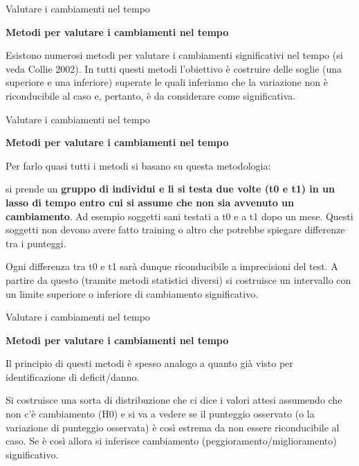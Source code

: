 \documentclass[
  ignorenonframetext,
  aspectratio=169,
]{beamer}
\begin{document}
\begin{frame}{Valutare i cambiamenti nel tempo}
\label{valutare-i-cambiamenti-nel-tempo-6}
\begin{center}
  \textbf{Metodi per valutare i cambiamenti nel tempo}
\end{center}
\vspace{2em}

Esistono numerosi metodi per valutare i cambiamenti significativi nel
tempo (si veda Collie 2002). In tutti questi metodi l'obiettivo è
costruire delle soglie (una superiore e una inferiore) superate le quali
inferiamo che la variazione non è riconducibile al caso e, pertanto, è
da considerare come significativa.
\end{frame}

\begin{frame}{Valutare i cambiamenti nel tempo}
\label{valutare-i-cambiamenti-nel-tempo-7}
\begin{center}
  \textbf{Metodi per valutare i cambiamenti nel tempo}
\end{center}
\vspace{2em}

Per farlo quasi tutti i metodi si basano su questa metodologia:

si prende un \textbf{gruppo di individui e li si testa due volte (t0 e
t1) in un lasso di tempo entro cui si assume che non sia avvenuto un
cambiamento}. Ad esempio soggetti sani testati a t0 e a t1 dopo un mese.
Questi soggetti non devono avere fatto training o altro che potrebbe
spiegare differenze tra i punteggi.

Ogni differenza tra t0 e t1 sarà dunque riconducibile a imprecisioni del
test. A partire da questo (tramite metodi statistici diversi) si
costruisce un intervallo con un limite superiore o inferiore di
cambiamento significativo.
\end{frame}

\begin{frame}{Valutare i cambiamenti nel tempo}
\label{valutare-i-cambiamenti-nel-tempo-8}
\begin{center}
  \textbf{Metodi per valutare i cambiamenti nel tempo}
\end{center}
\vspace{1em}

Il principio di questi metodi è spesso analogo a quanto già visto per
identificazione di deficit/danno.

Si costruisce una sorta di distribuzione che ci dice i valori attesi
assumendo che non c'è cambiamento (H0) e si va a vedere se il punteggio
osservato (o la variazione di punteggio osservata) è così estrema da non
essere riconducibile al caso. Se è così allora si inferisce cambiamento
(peggioramento/miglioramento) significativo.
\end{frame}
\end{document}
